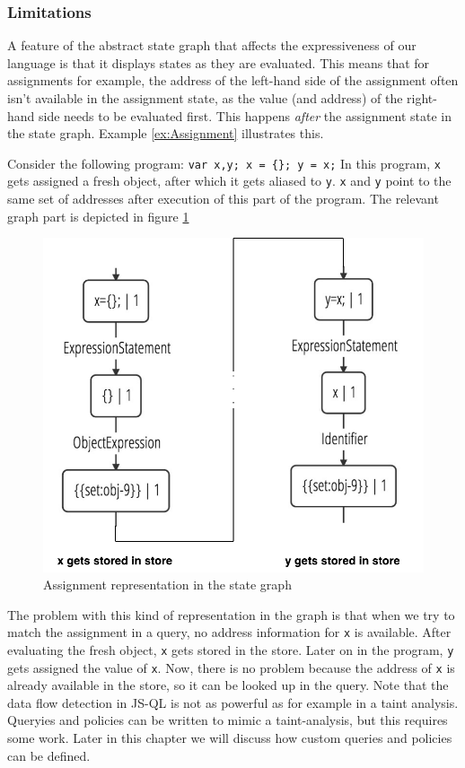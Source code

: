 \subsubsection*{Limitations}

 A feature of the abstract state graph that affects the expressiveness of our language is that it displays states as they are evaluated. This means that for assignments for example, the address of the left-hand side of the assignment often isn't available in the assignment state, as the value (and address) of the right-hand side needs to be evaluated first. This happens \textit{after} the assignment state in the state graph. Example \ref{ex:Assignment} illustrates this.

\begin{exmp}
\label{ex:Assignment}
Consider the following program:
\texttt{var x,y; x = \{\}; y = x;}
In this program, \texttt{x} gets assigned a fresh object, after which it gets aliased to \texttt{y}. \texttt{x} and \texttt{y} point to the same set of addresses after execution of this part of the program.
The relevant graph part is depicted in figure \ref{fig:AssignmentLookup}


\begin{figure}[!h]
    \centering
      \includegraphics[width=.5\textwidth]{images/assignmentLookup} 
      \caption{Assignment representation in the state graph}
    \label{fig:AssignmentLookup}
\end{figure}


The problem with this kind of representation in the graph is that when we try to match the assignment in a query, no address information for \texttt{x} is available. After evaluating the fresh object, \texttt{x} gets stored in the store. Later on in the program, \texttt{y} gets assigned the value of \texttt{x}. Now, there is no problem because the address of \texttt{x} is already available in the store, so it can be looked up in the query. Note that the data flow detection in JS-QL is not as powerful as for example in a taint analysis. Queryies and policies can be written to mimic a taint-analysis, but this requires some work. Later in this chapter we will discuss how custom queries and policies can be defined.
\end{exmp}

